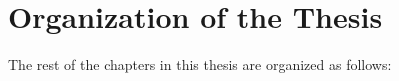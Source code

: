 






\section{Organization of the Thesis}
The rest of the chapters in this thesis are organized as follows:

